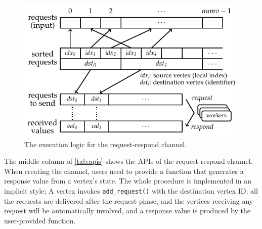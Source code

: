 \documentclass{sokendai_thesis} %
\begin{document}

\begin{figure}[t]
 \centering
 \includegraphics[width=\textwidth]{figures/reqresp-impl.pdf}
 \caption{The execution logic for the request-respond channel.}%
 \label{fig:reqresp-impl}
\end{figure}

The middle column of \autoref{tab:apis} shows the APIs of the request-respond channel.
When creating the channel, users need to provide a function that generates a response value from a vertex's state.
The whole procedure is implemented in an implicit style; A vertex invokes \texttt{add\_request()} with the destination vertex ID;
all the requests are delivered after the request phase, and the vertices receiving any request will be automatically involved, and a response value is produced by the user-provided function.
\end{document}
